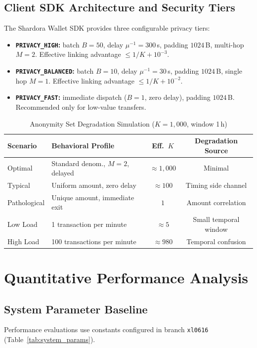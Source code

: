 \documentclass[sigconf,nonacm]{acmart}
\begin{document}
\subsection{Client SDK Architecture and Security Tiers}
The Shardora Wallet SDK provides three configurable privacy tiers:
\begin{itemize}
    \item \textbf{\texttt{PRIVACY\_HIGH}:} batch $B=50$, delay $\mu^{-1}=300$\,s, padding $1024$\,B, multi-hop $M=2$. Effective linking advantage $\le 1/K + 10^{-3}$.
    \item \textbf{\texttt{PRIVACY\_BALANCED}:} batch $B=10$, delay $\mu^{-1}=30$\,s, padding $1024$\,B, single hop $M=1$. Effective linking advantage $\le 1/K + 10^{-2}$.
    \item \textbf{\texttt{PRIVACY\_FAST}:} immediate dispatch ($B=1$, zero delay), padding $1024$\,B. Recommended only for low-value transfers.
\end{itemize}

\begin{table}[H]
\centering
\caption{Anonymity Set Degradation Simulation ($K=1{,}000$, window 1\,h)}
\label{tab:anonymity_simulation}
\small
\begin{tabularx}{\columnwidth}{lXcc}
\toprule
\textbf{Scenario} & \textbf{Behavioral Profile} & \textbf{Eff.\ $K$} & \textbf{Degradation Source} \\
\midrule
Optimal & Standard denom., $M=2$, delayed & $\approx 1{,}000$ & Minimal \\
Typical & Uniform amount, zero delay & $\approx 100$ & Timing side channel \\
Pathological & Unique amount, immediate exit & $1$ & Amount correlation \\
Low Load & 1 transaction per minute & $\approx 5$ & Small temporal window \\
High Load & 100 transactions per minute & $\approx 980$ & Temporal confusion \\
\bottomrule
\end{tabularx}
\end{table}

\section{Quantitative Performance Analysis}

\subsection{System Parameter Baseline}
Performance evaluations use constants configured in branch \texttt{xl0616} (Table~\ref{tab:system_params}).
\end{document}
